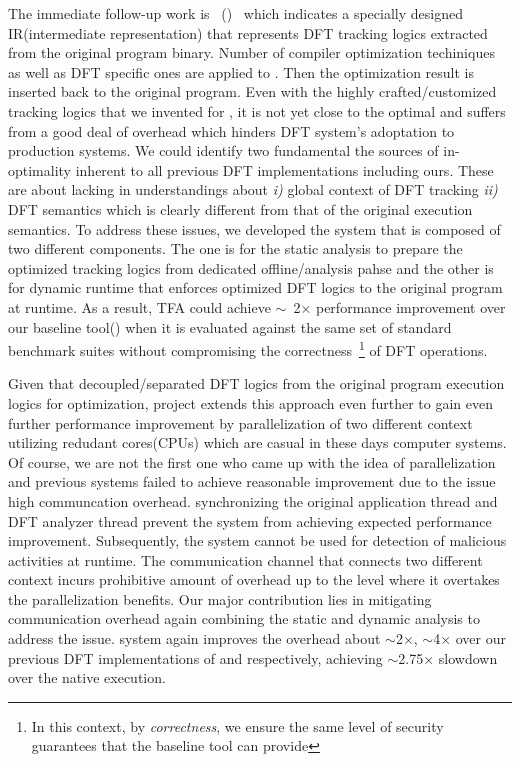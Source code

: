 \documentclass[letterpaper, 10pt]{article}
\begin{document}
\begin{small}
The immediate follow-up work is \TFAFull~(\TFA)~\cite{tfa:2012ndss} which
indicates a specially designed IR(intermediate representation) that represents
DFT tracking logics extracted from the original program binary.  Number of
compiler optimization techiniques as well as DFT specific ones are applied to
\TFA. Then the optimization result is inserted back to the original program. 
%
Even with the highly crafted/customized tracking logics that we invented for
\libdft, it is not yet close to the optimal and suffers from a good deal of
overhead which hinders DFT system's adoptation to production systems. We could
identify two fundamental the sources of in-optimality inherent to all
previous DFT implementations including ours. These are about lacking in
understandings about {\it i)} global context of DFT tracking {\it ii)} DFT
semantics which is clearly different from that of the original execution
semantics.
%
To address these issues, we developed the system that is composed of two
different components. The one is for the static analysis to prepare the
optimized tracking logics from dedicated offline/analysis pahse and the other
is for dynamic runtime that enforces optimized DFT logics to the original
program  at runtime.
%
As a result, TFA could achieve \(\sim\)~2\(\times\) performance improvement
over  our baseline tool(\libdft) when it is evaluated against the same set of
standard benchmark suites without compromising the correctness~\footnote{In
        this context, by {\it correctness}, we ensure the same level of
security guarantees that the baseline tool \libdft can provide} of DFT
operations.

Given that \TFA decoupled/separated DFT logics from the original program
execution logics for optimization, \SR project extends this approach even
further to gain even further performance improvement by parallelization of two
different context utilizing redudant cores(CPUs) which are casual in these days
computer systems. Of course, we are not the first one who came up with the idea
of parallelization and previous systems failed to achieve reasonable
improvement due to the issue high communcation overhead. synchronizing the
original application thread and DFT analyzer thread prevent the system from
achieving expected performance improvement.  Subsequently, the system cannot be
used for detection of malicious activities at runtime.
%
The communication channel that connects two different context incurs
prohibitive amount of overhead up to the level where it overtakes the
parallelization benefits. Our major contribution lies in mitigating
communication overhead again combining the static and dynamic analysis to
address the issue.
%
\SR system again improves the overhead about $\sim$2$\times$, $\sim$4$\times$
over our previous DFT implementations of \TFA and \libdft respectively,
achieving $\sim$2.75$\times$ slowdown over the native execution. 


\end{small}
\end{document}
